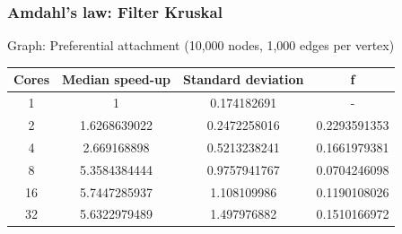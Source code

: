 \documentclass{beamer}
\begin{document}
\begin{frame}

    \frametitle{Amdahl's law: Filter Kruskal}

	Graph: Preferential attachment (10,000 nodes, 1,000 edges per vertex)

	\begin{center}
		\begin{tabular}{||c c c c||} 
			\hline
            Cores & Median speed-up & Standard deviation & f \\ [0.5ex] 
			\hline\hline
			1 & 1 & 0.174182691 & - \\
			\hline
			2 & 1.6268639022 & 0.2472258016 & 0.2293591353 \\
			\hline
			4 & 2.669168898	& 0.5213238241 & 0.1661979381 \\
			\hline
			8 & 5.3584384444 & 0.9757941767 & 0.0704246098 \\
			\hline
			16 & 5.7447285937 & 1.108109986 & 0.1190108026 \\
			\hline
			32 & 5.6322979489 & 1.497976882 & 0.1510166972 \\ [1ex] 
			\hline
		\end{tabular}
	\end{center}

\end{frame}

\begin{frame}
    \printbibliography
\end{frame} 
\end{document}
